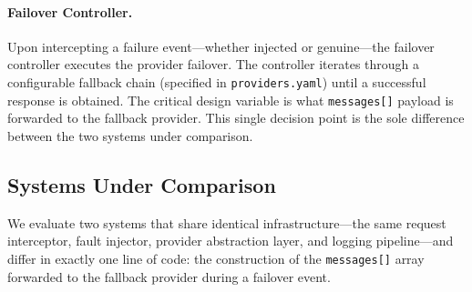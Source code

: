 \paragraph{Failover Controller.}
Upon intercepting a failure event---whether injected or genuine---the failover controller executes the provider failover. The controller iterates through a configurable fallback chain (specified in \texttt{providers.yaml}) until a successful response is obtained. The critical design variable is what \texttt{messages[]} payload is forwarded to the fallback provider. This single decision point is the sole difference between the two systems under comparison.

\subsection{Systems Under Comparison}

We evaluate two systems that share identical infrastructure---the same request interceptor, fault injector, provider abstraction layer, and logging pipeline---and differ in exactly one line of code: the construction of the \texttt{messages[]} array forwarded to the fallback provider during a failover event.

